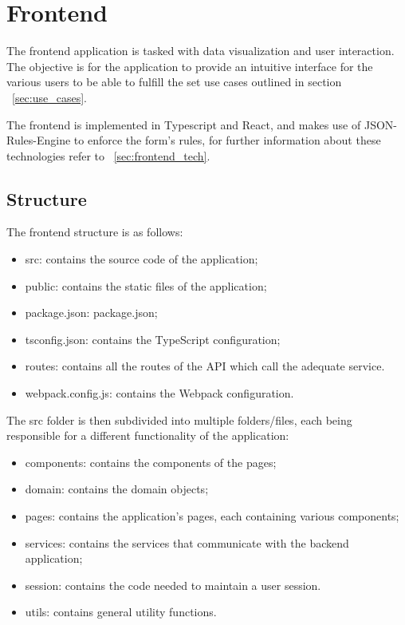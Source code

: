 \newpage

\section{Frontend} \label{frontend}

The frontend application is tasked with data visualization and user interaction. The objective is for the application to provide an intuitive interface for the various users to be able to fulfill the set use cases outlined in section ~\ref{sec:use_cases}.

The frontend is implemented in Typescript and React, and makes use of JSON-Rules-Engine to enforce the form's rules, for further information about these technologies refer to ~\ref{sec:frontend_tech}.

\subsection{Structure}

The frontend structure is as follows:

\begin{itemize}
	\item src: contains the source code of the application;
	\item public: contains the static files of the application;
	\item package.json:  package.json;
	\item tsconfig.json: contains the TypeScript configuration;
	\item routes: contains all the routes of the API which call the adequate service.
	\item webpack.config.js:  contains the Webpack configuration.
\end{itemize}

The src folder is then subdivided into multiple folders/files, each being responsible for a different functionality of the application:

\begin{itemize}
	\item components: contains the components of the pages;
	\item domain: contains the domain objects;
	\item pages:  contains the application's pages, each containing various components;
	\item services: contains the services that communicate with the backend application;
	\item session: contains the code needed to maintain a user session.
	\item utils:  contains general utility functions.
\end{itemize}


